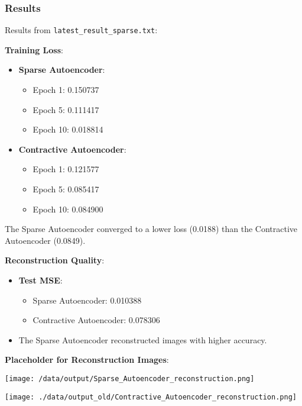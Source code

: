 \documentclass[12pt]{article}
\begin{document}
	\subsubsection{Results}
	Results from \texttt{latest\_result\_sparse.txt}:
	
	\textbf{Training Loss}:
	\begin{itemize}
		\item \textbf{Sparse Autoencoder}:
		\begin{itemize}
			\item Epoch 1: 0.150737
			\item Epoch 5: 0.111417
			\item Epoch 10: 0.018814
		\end{itemize}
		\item \textbf{Contractive Autoencoder}:
		\begin{itemize}
			\item Epoch 1: 0.121577
			\item Epoch 5: 0.085417
			\item Epoch 10: 0.084900
		\end{itemize}
	\end{itemize}
	The Sparse Autoencoder converged to a lower loss (0.0188) than the Contractive Autoencoder (0.0849).
	
	\textbf{Reconstruction Quality}:
	\begin{itemize}
		\item \textbf{Test MSE}:
		\begin{itemize}
			\item Sparse Autoencoder: 0.010388
			\item Contractive Autoencoder: 0.078306
		\end{itemize}
		\item The Sparse Autoencoder reconstructed images with higher accuracy.
	\end{itemize}
	\textbf{Placeholder for Reconstruction Images}:
	\begin{center}
		\texttt{[image: /data/output/Sparse\_Autoencoder\_reconstruction.png]}
	\end{center}
	\begin{center}
		\texttt{[image: ./data/output\_old/Contractive\_Autoencoder\_reconstruction.png]}
	\end{center}
	
\end{document}
